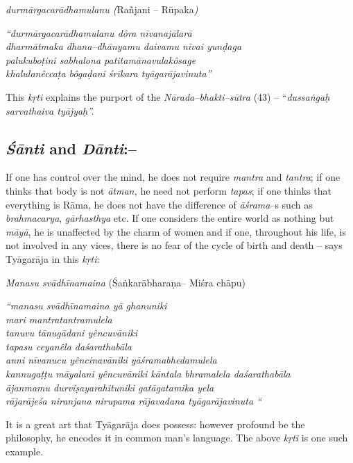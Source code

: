 \textit{durmārgacarādhamulanu (}Rañjani – Rūpaka\textit{)}

\begin{myquote}
\textit{“durmārgacarādhamulanu dôra nīvanajālarā}\\\textit{dharmātmaka dhana–dhānyamu daivamu nīvai yunḍaga}\\\textit{palukuboṭini sabhalona patitamānavulakôsage}\\\textit{khalulanêccaṭa bôgaḍani śrīkara tyāgarājavinuta”}
\end{myquote}

This \textit{kṛti} explains the purport of the \textit{Nārada–bhakti–sūtra} (43) – “\textit{dussaṅgaḥ sarvathaiva tyājyaḥ”.}


\subsection*{\textit{Śānti} and \textit{Dānti}:–}

If one has control over the mind, he does not require \textit{mantra} and \textit{tantra}; if one thinks that body is not \textit{ātman,} he need not perform \textit{tapas}; if one thinks that everything is Rāma, he does not have the difference of \textit{āśrama}–s such as \textit{brahmacarya}, \textit{gārhasthya} etc. If one considers the entire world as nothing but \textit{māyā}, he is unaffected by the charm of women and if one, throughout his life, is not involved in any vices, there is no fear of the cycle of birth and death – says Tyāgarāja in this \textit{kṛti}:

\textit{Manasu svādhīnamaina} (Śaṅkarābharaṇa– Miśra chāpu)

\begin{myquote}
\textit{“manasu svādhīnamaina yā ghanuniki}\\\textit{mari mantratantramulela}\\\textit{tanuvu tānugādani yêncuvāniki}\\\textit{tapasu ceyanêla daśarathabāla}\\\textit{anni nīvanucu yêncinavāniki yāśramabhedamulela}\\\textit{kannugaṭṭu māyalani yêncuvāniki kāntala bhramalela daśarathabāla}\\\textit{ājanmamu durviṣayarahituniki gatāgatamika yela}\\\textit{rājarājeśa niranjana nirupama rājavadana tyāgarājavinuta “}
\end{myquote}

It is a great art that Tyāgarāja does possess: however profound be the philosophy, he encodes it in common man’s language. The above \textit{kṛti} is one such example. 

